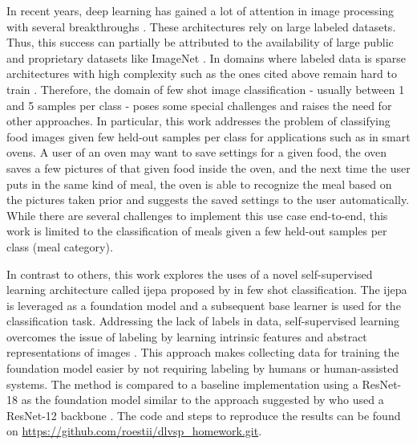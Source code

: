 In recent years, deep learning has gained a lot of attention in image processing with several breakthroughs
\cite{he_deep_2015, krizhevsky_imagenet_2012, tan_efficientnet_2020}. These architectures rely on large labeled datasets. 
Thus, this success can 
partially be attributed to the availability of large public and proprietary datasets like ImageNet \cite{deng_imagenet_2009}. 
In domains where labeled data is sparse architectures with high complexity such as the ones cited above 
remain hard to train \cite{brigato_close_2021}. Therefore, the domain of few shot image classification - 
usually between 1 and 5 samples per class - poses some special challenges and raises the need for other 
approaches. In particular, this work addresses the problem of classifying food images given few held-out 
samples per class for applications such as in smart ovens. A user of an oven may want to save settings for 
a given food, the oven saves a few pictures of that given food inside the oven, and the next time 
the user puts in the same kind of meal, the oven is able to recognize the meal based on the pictures taken 
prior and suggests the saved settings to the user automatically. While there are several challenges to implement 
this use case end-to-end, this work is limited to the classification of meals given a few held-out samples 
per class (meal category).

In contrast to others, this work explores the uses of a novel self-supervised learning architecture called 
\gls{ijepa} \cite{assran_self-supervised_2023} proposed by \citeauthor{assran_self-supervised_2023} 
in few shot classification. The \gls{ijepa} is leveraged as a foundation model and a subsequent base learner is 
used for the classification task.
Addressing the lack of labels in data, self-supervised learning overcomes the issue of labeling by learning
intrinsic features and abstract representations of images \cite{shwartz-ziv_what_2022}.
This approach makes collecting data for training the foundation model easier by not requiring labeling by humans 
or human-assisted systems. The method is compared to a baseline implementation using a ResNet-18 
as the foundation model similar to the approach suggested by
\citeauthor{tian_rethinking_2020} who used a ResNet-12 backbone \cite{tian_rethinking_2020}.
The code and steps to reproduce the results can be found on \url{https://github.com/roestii/dlvsp_homework.git}.
